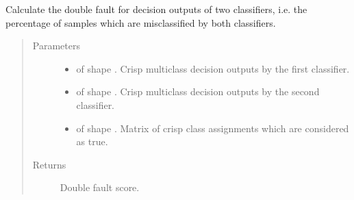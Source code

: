 \documentclass[letterpaper,10pt,english]{sphinxmanual}
\begin{document}
\begin{fulllineitems}
\label{\detokenize{pusion.evaluation.evaluation_metrics:pusion.evaluation.evaluation_metrics.double_fault}}
\sphinxAtStartPar
Calculate the double fault for decision outputs of two classifiers, i.e. the percentage of samples which are
misclassified by both classifiers.
\begin{quote}\begin{description}
\item[{Parameters}] \leavevmode\begin{itemize}
\item {} 
\sphinxAtStartPar
{} \textendash{}  of shape .
Crisp multiclass decision outputs by the first classifier.

\item {} 
\sphinxAtStartPar
{} \textendash{}  of shape .
Crisp multiclass decision outputs by the second classifier.

\item {} 
\sphinxAtStartPar
{} \textendash{}  of shape .
Matrix of crisp class assignments which are considered as true.

\end{itemize}

\item[{Returns}] \leavevmode
\sphinxAtStartPar
Double fault score.

\end{description}\end{quote}

\end{fulllineitems}

\end{document}
